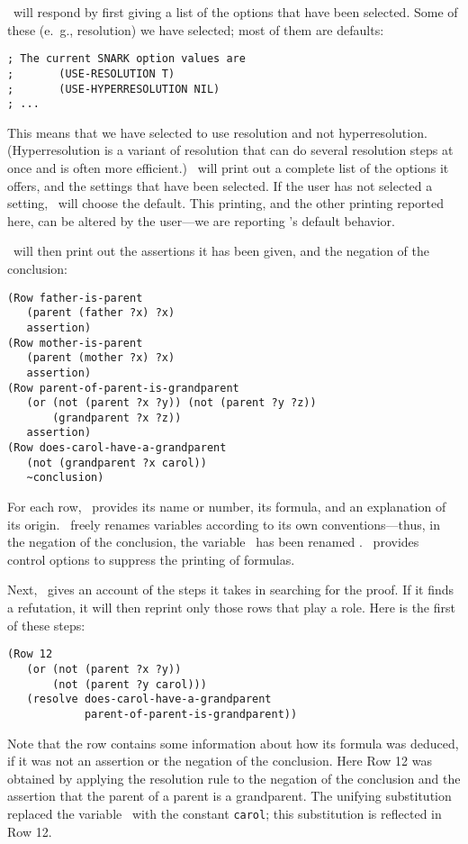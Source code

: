 \Snark\  will respond by first giving a list of the options that have
been selected.  Some of these (e.\ g., resolution) we have selected;
most of them are defaults:
\begin{verbatim}
; The current SNARK option values are
;       (USE-RESOLUTION T)
;       (USE-HYPERRESOLUTION NIL)
; ...
\end{verbatim}
This means that we have selected to use resolution and not
hyperresolution.  (Hyperresolution is a variant of
resolution that can do several resolution steps at once and is often
more efficient.) \Snark\  will print out a complete list of the
options it offers, and the settings that have been selected.  If the
user has not selected a setting, \Snark\  will choose the default.
This printing, and the other printing reported here, can be altered by
the user---we are reporting \Snark 's default behavior.

 \Snark\  will then print out the assertions it has been given, and the
negation of the conclusion:
\begin{verbatim}
(Row father-is-parent
   (parent (father ?x) ?x)
   assertion)
(Row mother-is-parent
   (parent (mother ?x) ?x)
   assertion)
(Row parent-of-parent-is-grandparent
   (or (not (parent ?x ?y)) (not (parent ?y ?z))
       (grandparent ?x ?z))
   assertion)
(Row does-carol-have-a-grandparent
   (not (grandparent ?x carol))
   ~conclusion)
\end{verbatim}

For each row, \snark\  provides its name or number, its formula, and an
explanation of its origin.  \Snark\  freely renames variables according
to its own conventions---thus, in the negation of the conclusion, the
variable \varz\  has been renamed \varx\/. \snark\  provides control
options to suppress the printing of formulas.

Next, \snark\  gives an account of the steps it takes in searching for
the proof.  If it finds a refutation, it will then reprint only those
rows that play a role.
Here is the first of these steps:
\begin{verbatim}
(Row 12
   (or (not (parent ?x ?y))
       (not (parent ?y carol)))
   (resolve does-carol-have-a-grandparent
            parent-of-parent-is-grandparent))
\end{verbatim}
Note that the row contains some information about how its formula was
deduced, if it was not an assertion or the negation of the conclusion.
Here Row 12 was obtained by applying the resolution rule to the
negation of the conclusion and the assertion that the parent of a
parent is a grandparent.  The unifying substitution replaced the
variable \varz\  with the constant {\tt carol}; this substitution is
reflected in Row 12.

